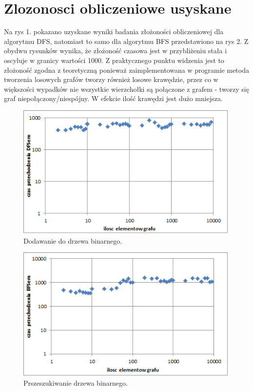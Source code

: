 	\section{Zlozonosci obliczeniowe usyskane}\label{sec:Zlozonosci obliczeniowe usyskane}
	Na rys 1. pokazano uzyskane wyniki badania złożoności obliczeniowej dla algorytmu DFS, natomiast to samo dla algorytmu BFS przedstawiono na rys 2. Z obydwu rysunków wynika, że złożoność czasowa jest w przybliżeniu stała i oscyluje w granicy wartości 1000.  Z praktycznego punktu widzenia jest to złożoność zgodna z teoretyczną ponieważ zaimplementowana w programie metoda tworzenia losowych grafów tworzy również losowe krawędzie, przez co w większości wypadków nie wszystkie wierzchołki są połączone z grafem - tworzy się graf niepołączony/niespójny. W efekcie ilość krawędzi jest dużo mniejsza.
	\begin{figure}[h]
	\centering
	\includegraphics[scale=0.9]{1.png}
	\caption{Dodawanie do drzewa binarnego.}
	\label{fig:1}
	\end{figure}
	\begin{figure}
	\centering
	\includegraphics[scale=0.90]{2.png}
	\caption{Prszeszukiwanie drzewa binarnego.}
	\label{fig:2}
	\end{figure}


